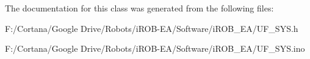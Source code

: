 The documentation for this class was generated from the following files\+:\begin{DoxyCompactItemize}
\item 
F\+:/\+Cortana/\+Google Drive/\+Robots/i\+R\+O\+B-\/\+E\+A/\+Software/i\+R\+O\+B\+\_\+\+E\+A/U\+F\+\_\+\+S\+Y\+S.\+h\item 
F\+:/\+Cortana/\+Google Drive/\+Robots/i\+R\+O\+B-\/\+E\+A/\+Software/i\+R\+O\+B\+\_\+\+E\+A/U\+F\+\_\+\+S\+Y\+S.\+ino\end{DoxyCompactItemize}
